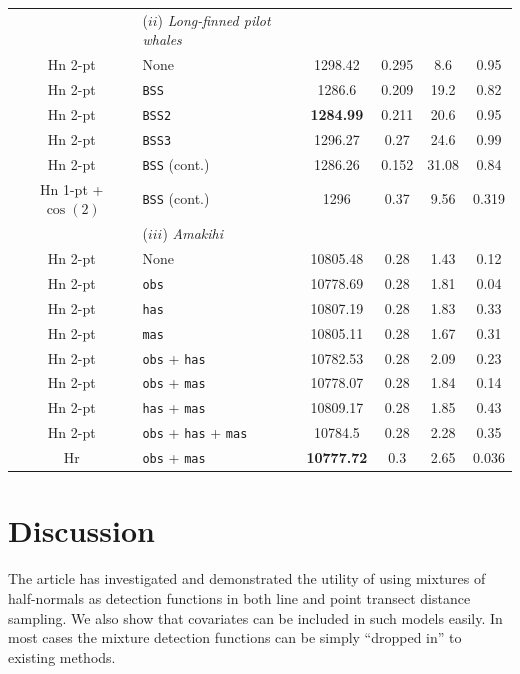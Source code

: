 \documentclass[useAMS,referee, usegraphicx]{biom}
\begin{document}
\begin{table}
\begin{tabular}{c l c c c c}
 & ($ii$) \textit{Long-finned pilot whales} & & & & \\
Hn 2-pt & None & 1298.42 & 0.295 & 8.6 & 0.95 \\
Hn 2-pt & \texttt{BSS} & 1286.6 & 0.209 & 19.2 & 0.82 \\
Hn 2-pt & \texttt{BSS2} & \textbf{1284.99} & 0.211 & 20.6 & 0.95\\
Hn 2-pt & \texttt{BSS3} & 1296.27 & 0.27 & 24.6 & 0.99 \\
Hn 2-pt & \texttt{BSS} (cont.) &  1286.26 & 0.152 & 31.08 & 0.84\\
Hn 1-pt + $\cos(2)$& \texttt{BSS} (cont.) & 1296 & 0.37 & 9.56 & 0.319 \\
 & ($iii$) \textit{Amakihi} & & & & \\
Hn 2-pt & None & 10805.48 & 0.28 & 1.43 & 0.12 \\
Hn 2-pt & \texttt{obs} & 10778.69 & 0.28 & 1.81 & 0.04\\
Hn 2-pt & \texttt{has} & 10807.19 &  0.28 & 1.83 & 0.33\\
Hn 2-pt & \texttt{mas} & 10805.11 &  0.28 & 1.67 & 0.31\\
Hn 2-pt & \texttt{obs} + \texttt{has} & 10782.53 & 0.28 & 2.09 & 0.23\\
Hn 2-pt & \texttt{obs} + \texttt{mas} & 10778.07 & 0.28 & 1.84 & 0.14\\
Hn 2-pt & \texttt{has} + \texttt{mas} & 10809.17 & 0.28 & 1.85 & 0.43 \\
Hn 2-pt & \texttt{obs} + \texttt{has} + \texttt{mas} & 10784.5 & 0.28 & 2.28 & 0.35\\
Hr & \texttt{obs} + \texttt{mas} & \textbf{10777.72} & 0.3 & 2.65 & 0.036 \\
\hline
\hline
\end{tabular}
\label{pilot-table}
\end{table}


\section{Discussion}
\label{s:discuss}

The article has investigated and demonstrated the utility of using mixtures of half-normals as detection functions in both line and point transect distance sampling. We also show that covariates can be included in such models easily. In most cases the mixture detection functions can be simply ``dropped in'' to existing methods.
\end{document}
